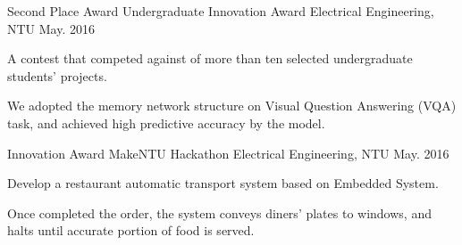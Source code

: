 \begin{cventries}
    \cventry
        {Second Place Award}
        {Undergraduate Innovation Award}
        {Electrical Engineering, NTU}
        {May. 2016}
        {
          \begin{cvitems}
            \item {A contest that competed against of more than ten selected undergraduate students' projects.}
            \item {We adopted the memory network structure on Visual Question Answering (VQA) task, and achieved high predictive accuracy by the model.}
          \end{cvitems}
        }
    \cventry
        {Innovation Award}
        {MakeNTU Hackathon}
        {Electrical Engineering, NTU}
        {May. 2016}
        {
          \begin{cvitems}
            \item {Develop a restaurant automatic transport system based on Embedded System.}
            \item {Once completed the order, the system conveys diners' plates to windows, and halts until accurate portion of food is served.}
          \end{cvitems}
        }
    
\end{cventries}